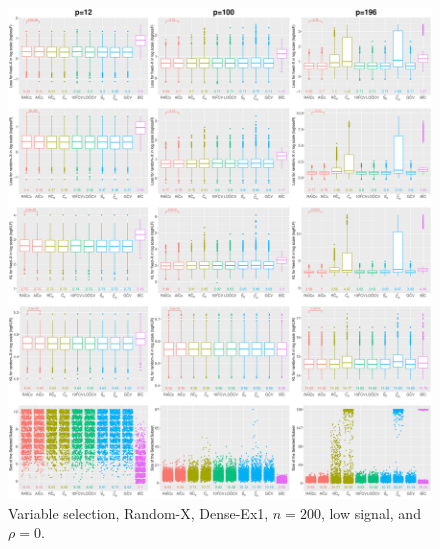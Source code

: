 \begin{figure}[!ht]
\centering
\includegraphics[width=\textwidth]{figures/supplement/randomx/subset_selection/Dense-Ex1_n200_lsnr_rho0.eps}
\caption{Variable selection, Random-X, Dense-Ex1, $n=200$, low signal, and $\rho=0$.}
\end{figure}
\clearpage
